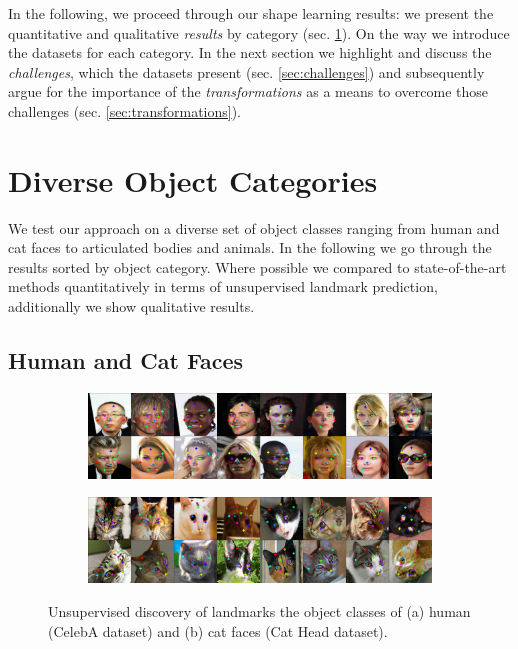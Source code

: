 	In the following, we proceed through our shape learning results: we present the quantitative and qualitative \textit{results} by category (sec. \ref{sec:results}). On the way we introduce the datasets for each category. In the next section we highlight and discuss the \textit{challenges}, which the datasets present (sec. \ref{sec:challenges}) and subsequently argue for the importance of the \textit{transformations} as a means to overcome those challenges (sec. \ref{sec:transformations}).

\section{Diverse Object Categories}\label{sec:results}
	We test our approach on a diverse set of object classes ranging from human and cat faces to articulated bodies and animals. In the following we go through the results sorted by object category. Where possible we compared to state-of-the-art methods quantitatively in terms of unsupervised landmark prediction, additionally we show qualitative results.
	\subsection{Human and Cat Faces}
		\begin{figure}[htp]
			\centering
			\begin{subfigure}{1.\textwidth}
			\includegraphics[trim={0cm 0cm 0cm 0cm},clip, width=1.\linewidth]{fig/shape/0celeba}\caption{}
			\end{subfigure}
			\begin{subfigure}{1.\textwidth}
			\includegraphics[trim={0cm 0cm 0cm 0cm},clip, width=1.\linewidth]{fig/shape/0cats}\caption{}
			\end{subfigure}
			\caption{{Unsupervised discovery of landmarks the object classes of (a) human (CelebA dataset) and (b) cat faces (Cat Head dataset).}}
			\label{fig:kp_faces}
		\end{figure}

